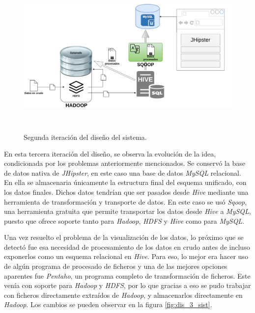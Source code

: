 \begin{figure}[H]
    \centering
    \includegraphics[width=1\textwidth,height=8cm]{Imagenes/Dis_Fig_2}
    \caption{Segunda iteración del diseño del sistema.}
    \label{fig:dis_2_sist}
\end{figure}
\par


En esta tercera iteración del diseño, se observa la evolución de la idea, condicionada por los problemas anteriormente mencionados. Se conservó la base de datos nativa de \textit{JHipster}, en este caso una base de datos \textit{MySQL} relacional. En ella se almacenaria únicamente la estructura final del esquema unificado, con los datos finales. Dichos datos tendrían que ser pasados desde \textit{Hive} mediante una herramienta de transformación y transporte de datos. En este caso se usó \textit{Sqoop}, una herramienta gratuita que permite transportar los datos desde \textit{Hive} a \textit{MySQL}, puesto que ofrece soporte tanto para \textit{Hadoop}, \textit{HDFS} y \textit{Hive} como para \textit{MySQL}. \par
Una vez resuelto el problema de la visualización de los datos, lo próximo que se detectó fue esa necesidad de procesamiento de los datos en crudo antes de incluso exponerlos como un esquema relacional en \textit{Hive}. Para eso, lo mejor era hacer uso de algún programa de procesado de ficheros y una de las mejores opciones aparentes fue \textit{Pentaho}, un programa completo de transformación de ficheros. Este venía con soporte para \textit{Hadoop} y \textit{HDFS}, por lo que gracias a eso se pudo trabajar con ficheros directamente extraídos de \textit{Hadoop}, y almacenarlos directamente en \textit{Hadoop}. Los cambios se pueden observar en la figura \ref{fig:dis_3_sist}. \par


